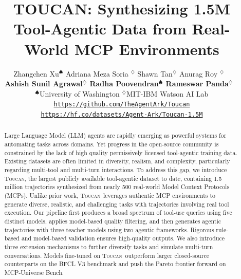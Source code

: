 \documentclass{article} %
\title{
\fontsize{16.9}{20}\selectfont
TOUCAN: Synthesizing 1.5M Tool-Agentic Data from Real-World MCP Environments}
\author{Zhangchen Xu$^\spadesuit$ \qquad Adriana Meza Soria $^\diamondsuit$ \qquad Shawn Tan$^\diamondsuit$
\qquad  Anurag Roy $^\diamondsuit$ ~\vspace{0.4em} \\
\textbf{Ashish Sunil Agrawal$^\diamondsuit$ \qquad  Radha Poovendran$^\spadesuit$ \qquad  Rameswar Panda$^\diamondsuit$}
~\vspace{0.5em}\\
$^\spadesuit$University of Washington \qquad
$^\diamondsuit$MIT-IBM Watson AI Lab \vspace{0.5em}
\\
{\small{\github{} {\texttt{\url{https://github.com/TheAgentArk/Toucan}}}}} \\
{\small{\huggingface{} {\texttt{\url{https://hf.co/datasets/Agent-Ark/Toucan-1.5M}}} 
}}}
\newcommand{\dataname}[0]{\textsc{Toucan~}}
\newcommand{\datanamen}[0]{\textsc{Toucan}}
\begin{document}
\maketitle

\begin{abstract}
Large Language Model (LLM) agents are rapidly emerging as powerful systems for automating tasks across domains. Yet progress in the open-source community is constrained by the lack of high quality permissively licensed tool-agentic training data. Existing datasets are often limited in diversity, realism, and complexity, particularly regarding multi-tool and multi-turn interactions. To address this gap, we introduce \datanamen, the largest publicly available tool-agentic dataset to date, containing 1.5 million trajectories synthesized from nearly 500 real-world Model Context Protocols (MCPs). Unlike prior work, \dataname leverages authentic MCP environments to generate diverse, realistic, and challenging tasks with trajectories involving real tool execution. Our pipeline first produces a broad spectrum of tool-use queries using five distinct models, applies model-based quality filtering, and then generates agentic trajectories with three teacher models using two agentic frameworks. Rigorous rule-based and model-based validation ensures high-quality outputs. We also introduce three extension mechanisms to further diversify tasks and simulate multi-turn conversations. Models fine-tuned on \dataname outperform larger closed-source counterparts on the BFCL V3 benchmark and push the Pareto frontier forward on MCP-Universe Bench.
\end{abstract}




% 











\appendix
\newpage
\end{document}
